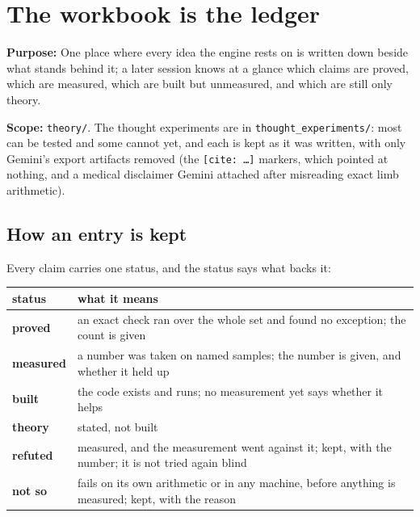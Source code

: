 \chapter{\texorpdfstring{The workbook is the ledger}{The workbook is the ledger}}
\label{chap:readme}

\textbf{Purpose:} One place where every idea the engine rests on is written down beside what stands behind it; a later session knows at a glance which claims are proved, which are measured, which are built but unmeasured, and which are still only theory.

\textbf{Scope:} \texttt{theory/\allowbreak{}}. The thought experiments are in \texttt{thought\_\allowbreak{}experiments/\allowbreak{}}: most can be tested and some cannot yet, and each is kept as it was written, with only Gemini's export artifacts removed (the \texttt{[cite: …]} markers, which pointed at nothing, and a medical disclaimer Gemini attached after misreading exact limb arithmetic).

\section{\texorpdfstring{How an entry is kept}{How an entry is kept}}

Every claim carries one status, and the status says what backs it:

{\small
\setlength{\tabcolsep}{6pt}
\begin{longtable}{>{\RaggedRight\arraybackslash}p{}>{\RaggedRight\arraybackslash}p{}}
\toprule
status & what it means \\
\midrule
\endhead
\textbf{proved} & an exact check ran over the whole set and found no exception; the count is given \\
\textbf{measured} & a number was taken on named samples; the number is given, and whether it held up \\
\textbf{built} & the code exists and runs; no measurement yet says whether it helps \\
\textbf{theory} & stated, not built \\
\textbf{refuted} & measured, and the measurement went against it; kept, with the number; it is not tried again blind \\
\textbf{not so} & fails on its own arithmetic or in any machine, before anything is measured; kept, with the reason \\
\bottomrule
\end{longtable}
}

